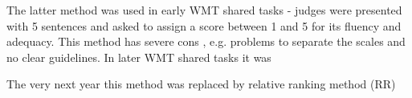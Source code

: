 The latter method was used in early WMT shared tasks - judges were presented with 5 sentences and asked to assign a score between 1 and 5 for its fluency and adequacy. This method has severe cons \citep{callison-burch-etal-2007-meta}, e.g. problems to separate the scales and no clear guidelines. 
In later WMT shared tasks it was


The very next year this method was replaced by relative ranking method (RR) \citep{callison-burch-etal-2007-meta}

